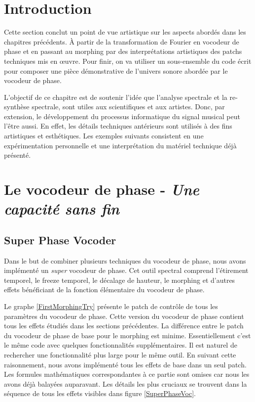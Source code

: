 
\label{ch:Implémentations aristiques}

\section{Introduction}

Cette section conclut un point de vue artistique sur les aspects abordés dans les chapitres précédents. À partir de la transformation de Fourier en vocodeur de phase et en passant au morphing par des interprétations artistiques des patchs techniques mis en œuvre. Pour finir, on va utiliser un sous-ensemble du code écrit pour composer une pièce démonstrative de l'univers sonore abordée par le vocodeur de phase.

L'objectif de ce chapitre est de soutenir l'idée que l'analyse spectrale et la re-synthèse spectrale, sont utiles aux scientifiques et aux artistes. Donc, par extension, le développement du processus informatique du signal musical peut l'être aussi. En effet, les détails techniques antérieurs sont utilisés à des fins artistiques et esthétiques. Les exemples suivants consistent en une expérimentation personnelle et une interprétation du matériel technique déjà présenté.

\section{Le vocodeur de phase - \textit{Une capacité sans fin}}

\subsection{Super Phase Vocoder}

Dans le but de combiner plusieurs techniques du vocodeur de phase, nous avons implémenté un \guillemotleft \textit{super} vocodeur de phase\guillemotright . Cet outil spectral comprend l'étirement temporel, le freeze temporel, le décalage de hauteur, le morphing et d'autres effets bénéficiant de la fonction élémentaire du vocodeur de phase.

Le graphe \ref{FirstMorphingTry} présente le patch de contrôle de tous les paramètres du vocodeur de phase. Cette version du vocodeur de phase contient tous les effets étudiés dans les sections précédentes. La différence entre le patch du vocodeur de phase de base pour le morphing est minime. Essentiellement c'est le même code avec quelques fonctionnalités supplémentaires. Il est naturel de rechercher une fonctionnalité plus large pour le même outil. En suivant cette raisonnement, nous avons implémenté tous les effets de base dans un seul patch. Les formules mathématiques correspondantes à ce partie sont omises car nous les avons déjà balayées auparavant. Les détails les plus cruciaux se trouvent dans la séquence de tous les effets visibles dans figure \ref{SuperPhaseVoc}.

